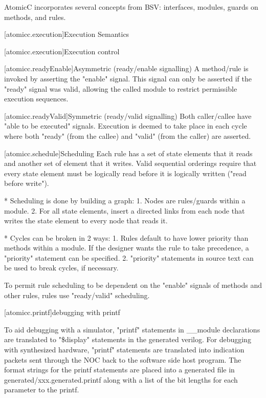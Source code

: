 AtomicC incorporates several concepts from BSV: interfaces, modules, guards on methods, and rules.



[atomicc.execution]{Execution Semantics}

[atomicc.execution]{Execution control}

[atomicc.readyEnable]{Asymmetric (ready/enable signalling)}
A method/rule is invoked by asserting the "enable" signal.  This signal can only be
asserted if the "ready" signal was valid, allowing the called module to restrict
permissible execution sequences.

[atomicc.readyValid]{Symmetric (ready/valid signalling)}
Both caller/callee have "able to be executed" signals.  Execution is deemed to take
place in each cycle where both "ready" (from the callee) and "valid" (from the caller)
are asserted.

[atomicc.schedule]{Scheduling}
Each rule has a set of state elements that it reads and another set of element that it writes.
Valid sequential orderings require that every state element must be logically read before it is logically
written ("read before write").

* Scheduling is done by building a graph:
1. Nodes are rules/guards within a module.
2. For all state elements, insert a directed links from each node that writes the state element to every node that reads it.

* Cycles can be broken in 2 ways:
1. Rules default to have lower priority than methods within a module.  If the designer wants the rule to take precedence, a "priority" statement can be specified.
2. "priority" statements in source text can be used to break cycles, if necessary.

To permit rule scheduling to be dependent on the "enable" signals of methods and other rules, rules use "ready/valid" scheduling.

[atomicc.printf]{debugging with printf}

To aid debugging with a simulator, "printf" statements in __module declarations are
translated to "\$display" statements in the generated verilog.
For debugging with synthesized hardware, "printf" statements are translated into
indication packets sent through the NOC back to the software side host program.
The format strings for the printf statements are placed into a generated file
in generated/xxx.generated.printf along with a list of the bit lengths for each
parameter to the printf.

